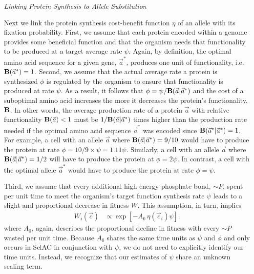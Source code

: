 \documentclass[12pt,letterpaper,fleqn]{article}
\renewcommand{\subsection}[1]{%
\bigskip
\begin{center}
\begin{large}
\normalfont\itshape #1
\end{large}
\end{center}}
\newcommand{\Funcaoptvec}{\ensuremath{\Func(\aoptvec|\aoptvec)}\xspace}
\newcommand{\Funcavec}{\ensuremath{\Func(\avec|\aoptvec)}\xspace}
\newcommand{\Func}{\ensuremath{\text{\textbf{B}}}\xspace}
\newcommand{\simP}{\ensuremath{\sim P}\xspace}
\newcommand{\selac}{SelAC\xspace}
\newcommand{\aoptvec}{\ensuremath{\Vec{a}^*}\xspace}
\newcommand{\avec}{\ensuremath{\Vec{a}}\xspace}
\newcommand{\cveci}{\ensuremath{\cvec_i}\xspace}
\newcommand{\cvec}{\ensuremath{\Vec{c}}\xspace}
\begin{document}
\subsection{Linking Protein Synthesis to Allele Substitution}
Next we link the protein synthesis cost-benefit function $\eta$ of an allele with its fixation probability.
First, we assume that each protein encoded within a genome provides some beneficial function and that the organism needs that functionality to be produced at a target average rate $\psi$.
Again, by definition, the optimal amino acid sequence for a given gene, \aoptvec, produces one unit of functionality, i.e.~$\Func(\aoptvec) = 1$.
Second, we assume that the actual average rate a protein is synthesized $\phi$ is regulated by the organism to ensure that functionality is produced at rate $\psi$.
As a result, it follows that $\phi = \psi/\Funcavec$ and the cost of a suboptimal amino acid increases the more it decreases the protein's functionality, \Func.
In other words, the average production rate of a protein \avec with relative functionality $\Func(\avec) < 1$ must be $1/\Funcavec$ times higher than the production rate needed if the optimal amino acid sequence \aoptvec was encoded since $\Funcaoptvec = 1$.
For example, a cell with an allele \avec where $\Funcavec = 9/10$ would have to produce the protein at rate $\phi = 10/9 \times \psi = 1.11 \psi$.
Similarly, a cell with an allele \avec where $\Funcavec = 1/2$ will have to produce the protein at $\phi = 2 \psi$.
In contrast, a cell with the optimal allele \aoptvec would have to produce the protein at rate $\phi = \psi$.



Third, we assume that every additional high energy phosphate bond, \simP, spent per unit time to meet the organism's target function synthesis rate $\psi$ leads to a slight and proportional decrease in fitness $W$.
This assumption, in turn, implies
\begin{align}
  W_i\left(\cvec\right) &\propto \exp\left[- A_0 \, \eta(\cveci) \psi\right].
\end{align}
where $A_0$, again, describes the proportional decline in fitness with every \simP wasted per unit time.
Because $A_0$ shares the same time units as $\psi$ and $\phi$ and only occurs in \selac in conjunction with $\psi$, we do not need to explicitly identify our time units.
Instead, we recognize that our estimates of $\psi$ share an unknown scaling term.
\end{document}

